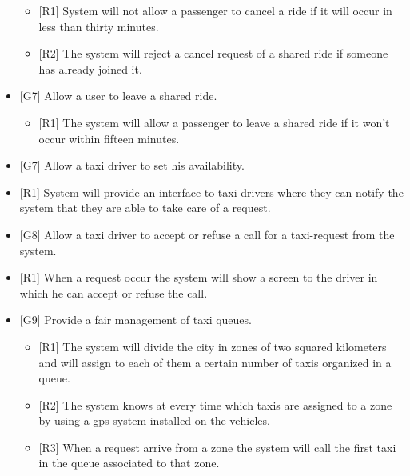 \begin{itemize}
\begin{itemize}
				\item {[R1]} System will not allow a passenger to cancel a ride if it will occur in less than thirty minutes.
				\item {[R2]} The system will reject a cancel request of a shared ride if someone has already joined it.
			\end{itemize}
		\item {[G7]} Allow a user to leave a shared ride.
			\begin{itemize}
				\item {[R1]} The system will allow a passenger to leave a shared ride if it won't occur within fifteen minutes.
			\end{itemize}
		\item {[G7]} Allow a taxi driver to set his availability.
			\item {[R1]} System will provide an interface to taxi drivers where they can notify the system that they are able to take care of a request.
		\item {[G8]} Allow a taxi driver to accept or refuse a call for a taxi-request from the system.
			\item {[R1]} When a request occur the system will show a screen to the driver in which he can accept or refuse the call.
		\item {[G9]} Provide a fair management of taxi queues.
			\begin{itemize}
				\item {[R1]} The system will divide the city in zones of two squared kilometers and will assign to each of them a certain number of taxis organized in a queue.
				\item {[R2]} The system knows at every time which taxis are assigned to a zone by using a gps system installed on the vehicles.
				\item {[R3]} When a request arrive from a zone the system will call the first taxi in the queue associated to that zone.
			\end{itemize}
		\end{itemize}